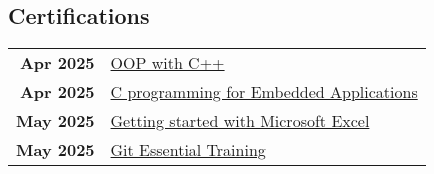 \documentclass[lighthipster]{simplehipstercv}
\begin{document}
\begin{paracol}{2}
    \vspace{1em}

    \begin{minipage}[t]{0.3\textwidth}
        \section*{Certifications}
        \begin{tabular}{>{\footnotesize\bfseries}r >{\footnotesize}p{}}
            Apr 2025 & \href{https://www.linkedin.com/learning/certificates/0d2436d703664eda7f28df73ca4216c3d028e37f4785ed9bd46fb9feb3981d10}{OOP with C++} \\
            Apr 2025 & \href{https://www.linkedin.com/learning/certificates/b9326f397277b66a58dfcfd4ea7e9d1ea10154daa7fb4b5c6698e5a81c0a3251}{C programming for Embedded Applications} \\
            May 2025 & \href{https://www.coursera.org/account/accomplishments/verify/6MX1VKYLQDJ7}{Getting started with Microsoft Excel} \\
            May 2025 & \href{https://www.linkedin.com/learning/certificates/d844a5ebadec3231609aad102789b3d830ffc5ab224192d38705e897becb9a0a}{Git Essential Training}
        \end{tabular}
        
        \bigskip
    \end{minipage}
    \hfill
    \begin{minipage}[t]{0.3\textwidth}

\end{minipage}
\end{paracol}
\end{document}
